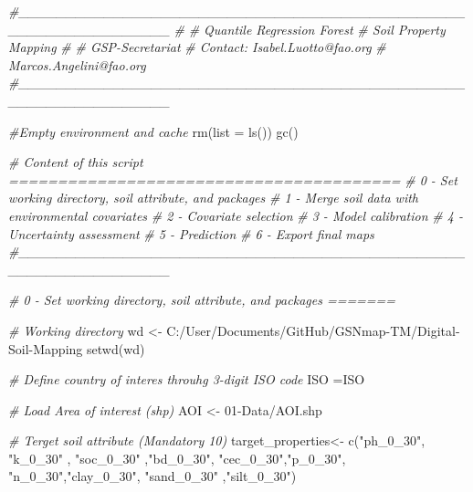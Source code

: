\documentclass[
  10pt,
  b5paper,
  oneside]{book}
\newenvironment{Shaded}{\begin{snugshade}}{\end{snugshade}}
\newcommand{\AttributeTok}[1]{\textcolor[rgb]{0.77,0.63,0.00}{#1}}
\newcommand{\CommentTok}[1]{\textcolor[rgb]{0.56,0.35,0.01}{\textit{#1}}}
\newcommand{\FunctionTok}[1]{\textcolor[rgb]{0.00,0.00,0.00}{#1}}
\newcommand{\NormalTok}[1]{#1}
\newcommand{\OtherTok}[1]{\textcolor[rgb]{0.56,0.35,0.01}{#1}}
\newcommand{\StringTok}[1]{\textcolor[rgb]{0.31,0.60,0.02}{#1}}
\begin{document}
\begin{Shaded}
\begin{Highlighting}[]
\CommentTok{\#\_\_\_\_\_\_\_\_\_\_\_\_\_\_\_\_\_\_\_\_\_\_\_\_\_\_\_\_\_\_\_\_\_\_\_\_\_\_\_\_\_\_\_\_\_\_\_\_\_\_\_\_\_\_\_\_\_\_\_\_\_\_\_\_}
\CommentTok{\#}
\CommentTok{\# Quantile Regression Forest}
\CommentTok{\# Soil Property Mapping}
\CommentTok{\#}
\CommentTok{\# GSP{-}Secretariat}
\CommentTok{\# Contact: Isabel.Luotto@fao.org}
\CommentTok{\#          Marcos.Angelini@fao.org}
\CommentTok{\#\_\_\_\_\_\_\_\_\_\_\_\_\_\_\_\_\_\_\_\_\_\_\_\_\_\_\_\_\_\_\_\_\_\_\_\_\_\_\_\_\_\_\_\_\_\_\_\_\_\_\_\_\_\_\_\_\_\_\_\_\_\_\_\_}

\CommentTok{\#Empty environment and cache }
\FunctionTok{rm}\NormalTok{(}\AttributeTok{list =} \FunctionTok{ls}\NormalTok{())}
\FunctionTok{gc}\NormalTok{()}

\CommentTok{\# Content of this script ========================================}
\CommentTok{\# 0 {-} Set working directory, soil attribute, and packages}
\CommentTok{\# 1 {-} Merge soil data with environmental covariates }
\CommentTok{\# 2 {-} Covariate selection}
\CommentTok{\# 3 {-} Model calibration}
\CommentTok{\# 4 {-} Uncertainty assessment}
\CommentTok{\# 5 {-} Prediction}
\CommentTok{\# 6 {-} Export final maps}
\CommentTok{\#\_\_\_\_\_\_\_\_\_\_\_\_\_\_\_\_\_\_\_\_\_\_\_\_\_\_\_\_\_\_\_\_\_\_\_\_\_\_\_\_\_\_\_\_\_\_\_\_\_\_\_\_\_\_\_\_\_\_\_\_\_\_\_\_}


\CommentTok{\# 0 {-} Set working directory, soil attribute, and packages =======}

\CommentTok{\# Working directory}
\NormalTok{wd }\OtherTok{\textless{}{-}} \StringTok{\textquotesingle{}C:/User/Documents/GitHub/GSNmap{-}TM/Digital{-}Soil{-}Mapping\textquotesingle{}}
\FunctionTok{setwd}\NormalTok{(wd)}

\CommentTok{\# Define country of interes throuhg 3{-}digit ISO code}
\NormalTok{ISO }\OtherTok{=}\StringTok{\textquotesingle{}ISO\textquotesingle{}}

\CommentTok{\# Load Area of interest (shp)}
\NormalTok{AOI }\OtherTok{\textless{}{-}} \StringTok{\textquotesingle{}01{-}Data/AOI.shp\textquotesingle{}}

\CommentTok{\# Terget soil attribute (Mandatory 10)}
\NormalTok{target\_properties}\OtherTok{\textless{}{-}} \FunctionTok{c}\NormalTok{(}\StringTok{"ph\_0\_30"}\NormalTok{, }\StringTok{"k\_0\_30"}\NormalTok{ ,}
                      \StringTok{"soc\_0\_30"}\NormalTok{ ,}\StringTok{"bd\_0\_30"}\NormalTok{, }\StringTok{"cec\_0\_30"}\NormalTok{,}\StringTok{"p\_0\_30"}\NormalTok{,   }
                      \StringTok{"n\_0\_30"}\NormalTok{,}\StringTok{"clay\_0\_30"}\NormalTok{, }\StringTok{"sand\_0\_30"} 
\NormalTok{                      ,}\StringTok{"silt\_0\_30"}\NormalTok{)}


\end{Highlighting}
\end{Shaded}
\end{document}
